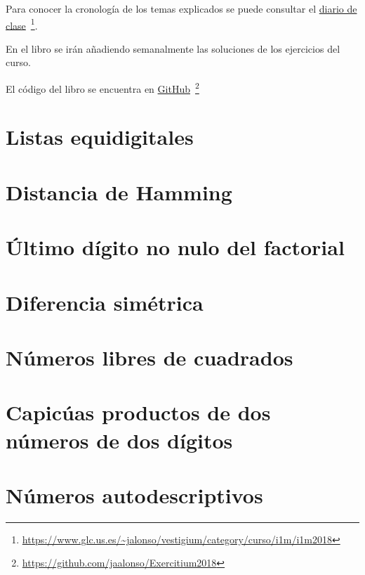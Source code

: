 \documentclass[a4paper,12pt,twoside]{book}
\begin{document}
Para conocer la cronología de los temas explicados se puede consultar el
\href{https://www.glc.us.es/~jalonso/vestigium/category/curso/i1m/i1m2018}
     {diario de clase}\
     \footnote{\url{https://www.glc.us.es/~jalonso/vestigium/category/curso/i1m/i1m2018}}.

En el libro se irán añadiendo semanalmente las soluciones de los
ejercicios del curso.

El código del libro se encuentra en
\href{https://github.com/jaalonso/Exercitium2018}
     {GitHub}\
     \footnote{\url{https://github.com/jaalonso/Exercitium2018}}

\chapter{Listas equidigitales}

\chapter{Distancia de Hamming}

\chapter{Último dígito no nulo del factorial}

\chapter{Diferencia simétrica}

\chapter{Números libres de cuadrados}

\chapter{Capicúas productos de dos números de dos dígitos}

 
\chapter{Números autodescriptivos}
\end{document}

